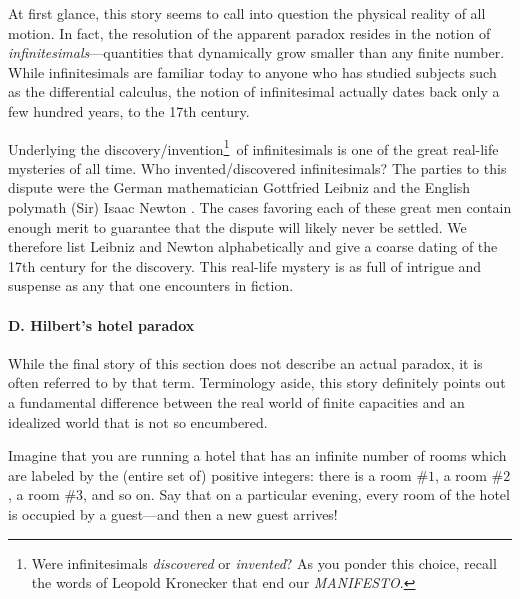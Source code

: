 \smallskip

At first glance, this story seems to call into question the physical reality of all motion.  In fact, the
resolution of the apparent paradox resides in the notion of {\em infinitesimals}---quantities that dynamically grow smaller than any finite number.  While infinitesimals are familiar today to anyone who has studied subjects such as the differential calculus, the notion of infinitesimal actually dates back only a few hundred years, to the 17th century.  

\medskip

    

Underlying the discovery/invention\footnote{Were infinitesimals {\em discovered} or {\em invented}?  As you ponder this choice, recall the words of Leopold Kronecker that end our {\it MANIFESTO}.}~of infinitesimals is one of the great real-life mysteries of all time.  Who invented/discovered infinitesimals?  The parties to this dispute were the German mathematician Gottfried Leibniz \cite{Leibniz} and the English polymath (Sir) Isaac Newton \cite{Newton}.   The cases favoring each of these great men contain enough merit to guarantee that the dispute will likely never be settled.  We therefore list Leibniz and Newton alphabetically and give a coarse dating of the 17th century for the discovery.  This real-life mystery is as full of intrigue and suspense as any that one encounters in fiction.


\paragraph{D. Hilbert's hotel paradox}

While the final story of this section does not describe an actual paradox, it is often referred to by that term.  Terminology aside, this story definitely points out a fundamental difference between the real world of finite capacities and an idealized world that is not so encumbered.

\medskip

Imagine that you are running a hotel that has an infinite number of rooms which are labeled by the (entire set of) positive integers: there is a room \#$1$, a room \#$2$, a room \#$3$, and so on.  Say
that on a particular evening, every room of the hotel is occupied by a guest---and then a new guest arrives!

